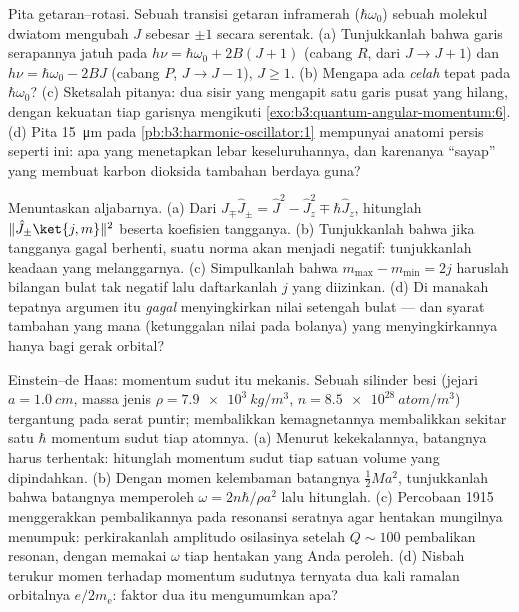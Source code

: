 \begin{exercise}[$\star\star\star$]\label{exo:b3:quantum-angular-momentum:10}
Pita getaran--rotasi. Sebuah transisi getaran inframerah
($\hbar\omega_0$) sebuah molekul dwiatom mengubah $J$ sebesar $\pm1$
secara serentak. (a) Tunjukkanlah bahwa garis serapannya jatuh pada $h\nu =
\hbar\omega_0 + 2B(J+1)$ (cabang $R$, dari $J \to J+1$) dan
$h\nu = \hbar\omega_0 - 2BJ$ (cabang $P$, $J \to J-1$), $J \ge
1$. (b) Mengapa ada \emph{celah} tepat pada $\hbar\omega_0$? (c)
Sketsalah pitanya: dua sisir yang mengapit satu garis pusat yang hilang,
dengan kekuatan tiap garisnya mengikuti
\cref{exo:b3:quantum-angular-momentum:6}. (d) Pita
\qty{15}{\micro m} pada \cref{pb:b3:harmonic-oscillator:1} mempunyai
anatomi persis seperti ini: apa yang menetapkan lebar keseluruhannya,
dan karenanya ``sayap'' yang membuat karbon dioksida tambahan berdaya guna?
\end{exercise}

\begin{exercise}[$\star\star\star$]\label{exo:b3:quantum-angular-momentum:11}
Menuntaskan aljabarnya. (a) Dari $\hat J_\mp\hat J_\pm = \hat J^2 -
\hat J_z^2 \mp \hbar\hat J_z$, hitunglah $\|\hat J_\pm\ket{j,m}\|^2$
beserta koefisien tangganya. (b) Tunjukkanlah bahwa jika tangganya gagal
berhenti, suatu norma akan menjadi negatif: tunjukkanlah keadaan yang
melanggarnya.
(c) Simpulkanlah bahwa $m_{\max} - m_{\min} = 2j$ haruslah bilangan
bulat tak negatif lalu daftarkanlah $j$ yang diizinkan. (d) Di manakah
tepatnya argumen itu \emph{gagal} menyingkirkan nilai setengah bulat ---
dan syarat tambahan yang mana (ketunggalan nilai pada bolanya) yang
menyingkirkannya hanya bagi gerak orbital?
\end{exercise}

\begin{exercise}[$\star\star\star$]\label{exo:b3:quantum-angular-momentum:12}
Einstein--de Haas: momentum sudut itu mekanis. Sebuah silinder besi
(jejari $a = \qty{1.0}{cm}$, massa jenis $\rho = \qty{7.9e3}{kg/m^3}$,
$n = \qty{8.5e28}{atom/m^3}$) tergantung pada serat puntir; membalikkan
kemagnetannya membalikkan sekitar satu $\hbar$ momentum sudut tiap
atomnya. (a) Menurut kekekalannya, batangnya harus terhentak: hitunglah
momentum sudut tiap satuan volume yang dipindahkan. (b) Dengan momen kelembaman batangnya $\tfrac12 M
a^2$, tunjukkanlah bahwa batangnya memperoleh $\omega = 2n\hbar/\rho a^2$
lalu hitunglah. (c) Percobaan 1915 menggerakkan pembalikannya pada
resonansi seratnya agar hentakan mungilnya menumpuk: perkirakanlah
amplitudo osilasinya setelah $Q \sim 100$ pembalikan resonan, dengan
memakai $\omega$ tiap hentakan yang Anda peroleh. (d) Nisbah terukur
momen terhadap momentum sudutnya ternyata dua kali ramalan orbitalnya
$e/2m_{\text{e}}$: faktor dua itu mengumumkan apa?
\end{exercise}


